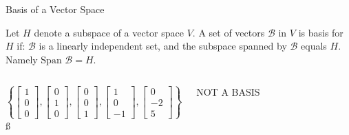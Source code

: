 \documentclass[xcolor=dvipsnames,aspectratio=169,t]{beamer}
\begin{document}
\begin{frame}{Basis of a Vector Space}

\bbox
Let $H$ denote a subspace of a vector space $V$. A set of vectors $\mathcal{B}$ in $V$ is \alert{basis for $H$} if:
\bb[(i)]
\ii $\mathcal{B}$ is a \alert{linearly independent set}, and
\ii the subspace spanned by $\mathcal{B}$ equals $H$. Namely \alert{$\mbox{Span } \mathcal{B} = H$}.
\ee
\ebox

\pause
\begin{columns}[T]

\column{0.42\tw}

\[ \left\{ \begin{bmatrix} 1 \\ 0 \\ 0 \end{bmatrix} ,  \begin{bmatrix} 0 \\ 1 \\ 0 \end{bmatrix} , \begin{bmatrix} 0 \\ 0 \\ 1 \end{bmatrix} , \begin{bmatrix} 1 \\ 0 \\ -1 \end{bmatrix}, \begin{bmatrix} 0 \\ -2 \\ 5 \end{bmatrix}  \right\}  \] \ss

\begin{center}\alert{NOT A BASIS} \end{center}

\column{0.29\tw}

\end{columns}
\end{frame}
\end{document}
